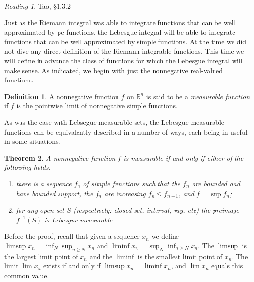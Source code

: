 \documentclass[11pt,oneside]{amsbook}
\newcommand{\RR}{{\mathbb R}}
\theoremstyle{definition}
\theoremstyle{plain}
\newtheorem{thm}{Theorem}[section]
\theoremstyle{definition}
\newtheorem{defn}[thm]{Definition}
\theoremstyle{remark}
\newtheorem*{reading}{Reading}
\numberwithin{equation}{section}
\numberwithin{figure}{section}
\begin{document}
\begin{reading}
  Tao, \S 1.3.2
\end{reading}

Just as the Riemann integral was able to integrate functions that can be well approximated by pc functions, the Lebesgue integral will be able to integrate functions that can be well approximated by simple functions. At the time we did not dive any direct definition of the Riemann integrable functions. This time we will define in advance the class of functions for which the Lebesgue integral will make sense. As indicated, we begin with just the nonnegative real-valued functions.

\begin{defn}
  A nonnegative function $f$ on $\RR^n$ is said to be a \emph{measurable function} if $f$ is the pointwise limit of nonnegative simple functions.
\end{defn}

As was the case with Lebsegue measurable sets, the Lebesgue measurable functions can be equivalently described in a number of ways, each being in useful in some situations.

\begin{thm}
  \label{thm:measurable-equiv}
  A nonnegative function $f$ is measurable if and only if either of the following holds.
  \begin{enumerate}
  \item there is a sequence $f_n$ of simple functions such that the $f_n$ are bounded and have bounded support, the $f_n$ are increasing $f_n\leq f_{n+1}$, and $f=\sup f_n$;
  \item for any open set $S$ (respectively: closed set, interval, ray, etc) the preimage $f^{-1}(S)$ is Lebesgue measurable.
  \end{enumerate}
\end{thm}

Before the proof, recall that given a sequence $x_n$ we define $\limsup x_n=\inf_N\sup_{n\geq N}x_n$ and $\liminf x_n=\sup_N\inf_{n\geq N}x_n$. The $\limsup$ is the largest limit point of $x_n$ and the $\liminf$ is the smallest limit point of $x_n$. The limit $\lim x_n$ exists if and only if $\limsup x_n=\liminf x_n$, and $\lim x_n$ equals this common value.
\end{document}
